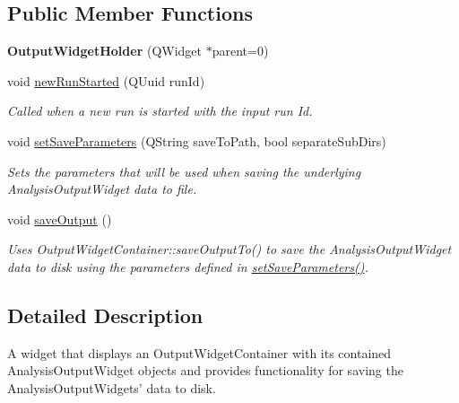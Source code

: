 \subsection*{Public Member Functions}
\begin{DoxyCompactItemize}
\item 
\hypertarget{class_output_widget_holder_a18941a5f65cacdb949cc2970ce6ec40c}{{\bfseries Output\-Widget\-Holder} (Q\-Widget $\ast$parent=0)}\label{class_output_widget_holder_a18941a5f65cacdb949cc2970ce6ec40c}

\item 
void \hyperlink{class_output_widget_holder_a7d166ee59d83794a973e188d426a5143}{new\-Run\-Started} (Q\-Uuid run\-Id)
\begin{DoxyCompactList}\small\item\em Called when a new run is started with the input run Id. \end{DoxyCompactList}\item 
void \hyperlink{class_output_widget_holder_ae0b0835bce19b376efe42802ecd70d3d}{set\-Save\-Parameters} (Q\-String save\-To\-Path, bool separate\-Sub\-Dirs)
\begin{DoxyCompactList}\small\item\em Sets the parameters that will be used when saving the underlying Analysis\-Output\-Widget data to file. \end{DoxyCompactList}\item 
\hypertarget{class_output_widget_holder_a5acb3b0139b50fe625bc3e9b840d4357}{void \hyperlink{class_output_widget_holder_a5acb3b0139b50fe625bc3e9b840d4357}{save\-Output} ()}\label{class_output_widget_holder_a5acb3b0139b50fe625bc3e9b840d4357}

\begin{DoxyCompactList}\small\item\em Uses Output\-Widget\-Container\-::save\-Output\-To() to save the Analysis\-Output\-Widget data to disk using the parameters defined in \hyperlink{class_output_widget_holder_ae0b0835bce19b376efe42802ecd70d3d}{set\-Save\-Parameters()}. \end{DoxyCompactList}\end{DoxyCompactItemize}


\subsection{Detailed Description}
A widget that displays an Output\-Widget\-Container with its contained Analysis\-Output\-Widget objects and provides functionality for saving the Analysis\-Output\-Widgets' data to disk. 

